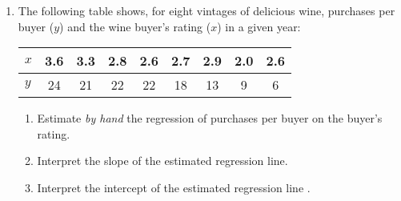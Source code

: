 \documentclass[11pt]{article}
\begin{document}
\begin{enumerate}
\def\labelenumi{\arabic{enumi}.}
\item
  The following table shows, for eight vintages of delicious wine,
  purchases per buyer (\(y\)) and the wine buyer's rating (\(x\)) in a
  given year:

  \begin{longtable}[]{@{}lcccccccc@{}}
  \toprule
  \(x\) & 3.6 & 3.3 & 2.8 & 2.6 & 2.7 & 2.9 & 2.0 & 2.6 \\
  \midrule
  \endhead
  \(y\) & 24 & 21 & 22 & 22 & 18 & 13 & 9 & 6 \\
  \bottomrule
  \end{longtable}

  \begin{enumerate}
  \item
    Estimate \emph{by hand} the regression of purchases per buyer on the
    buyer's rating.\\
  \item
    Interpret the slope of the estimated regression line.\\
  \item
    Interpret the intercept of the estimated regression line .\\
  \end{enumerate}
\end{enumerate}
\end{document}
